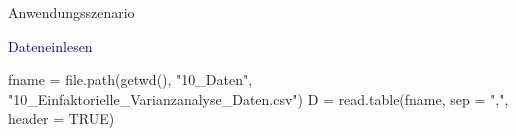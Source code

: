 \documentclass[
  8pt,
  ignorenonframetext,
]{beamer}
\newenvironment{Shaded}{\begin{snugshade}}{\end{snugshade}}
\newcommand{\AttributeTok}[1]{\textcolor[rgb]{0.77,0.63,0.00}{#1}}
\newcommand{\ConstantTok}[1]{\textcolor[rgb]{0.00,0.00,0.00}{#1}}
\newcommand{\FunctionTok}[1]{\textcolor[rgb]{0.00,0.00,0.00}{#1}}
\newcommand{\NormalTok}[1]{#1}
\newcommand{\OtherTok}[1]{\textcolor[rgb]{0.56,0.35,0.01}{#1}}
\newcommand{\StringTok}[1]{\textcolor[rgb]{0.31,0.60,0.02}{#1}}
\begin{document}
\begin{frame}[fragile]{Anwendungsszenario}
\protect\hypertarget{anwendungsszenario-1}{}
\vspace{3mm}
\small

\textcolor{darkblue}{Dateneinlesen}  \tiny \vspace{1mm}

\begin{Shaded}
\begin{Highlighting}[]
\NormalTok{fname       }\OtherTok{=} \FunctionTok{file.path}\NormalTok{(}\FunctionTok{getwd}\NormalTok{(), }\StringTok{"10\_Daten"}\NormalTok{, }\StringTok{"10\_Einfaktorielle\_Varianzanalyse\_Daten.csv"}\NormalTok{)}
\NormalTok{D           }\OtherTok{=} \FunctionTok{read.table}\NormalTok{(fname, }\AttributeTok{sep =} \StringTok{","}\NormalTok{, }\AttributeTok{header =} \ConstantTok{TRUE}\NormalTok{)}
\end{Highlighting}
\end{Shaded}

\vspace{-1mm}


\end{frame}
\end{document}

